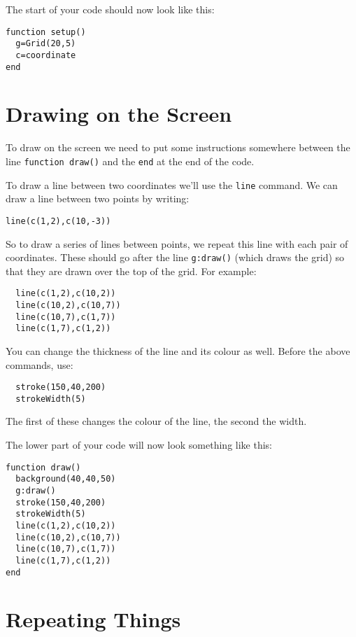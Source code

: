 \documentclass[
  xhtml,%
  use filename%
]{internet}
\begin{document}
The start of your code should now look like this:

\begin{verbatim}
function setup()
  g=Grid(20,5)
  c=coordinate
end
\end{verbatim}

\section{Drawing on the Screen}

To draw on the screen we need to put some instructions somewhere between the line \verb+function draw()+ and the \verb+end+ at the end of the code.

To draw a line between two coordinates we'll use the \verb+line+ command.
We can draw a line between two points by writing:

\begin{verbatim}
line(c(1,2),c(10,-3))
\end{verbatim}

So to draw a series of lines between points, we repeat this line with each pair of coordinates.
These should go after the line \verb+g:draw()+ (which draws the grid) so that they are drawn over the top of the grid.
For example:

\begin{verbatim}
  line(c(1,2),c(10,2))
  line(c(10,2),c(10,7))
  line(c(10,7),c(1,7))
  line(c(1,7),c(1,2))
\end{verbatim}

You can change the thickness of the line and its colour as well.
Before the above commands, use:

\begin{verbatim}
  stroke(150,40,200)
  strokeWidth(5)
\end{verbatim}

The first of these changes the colour of the line, the second the width.

The lower part of your code will now look something like this:

\begin{verbatim}
function draw()
  background(40,40,50)
  g:draw()
  stroke(150,40,200)
  strokeWidth(5)
  line(c(1,2),c(10,2))
  line(c(10,2),c(10,7))
  line(c(10,7),c(1,7))
  line(c(1,7),c(1,2))
end
\end{verbatim}

\section{Repeating Things}
\end{document}
